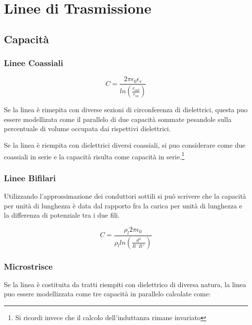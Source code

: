 \documentclass[10pt,a4paper]{report}
\begin{document}
\chapter{Linee di Trasmissione}

	\section{Capacità}

	
		\subsection{Linee Coassiali}
				\begin{equation}
				C=\frac{2\pi \epsilon_0 \epsilon_r} {ln (\frac { r_{out}} {r_{in} } )}
				\end{equation}

				Se la linea è rimepita con diverse sezioni di circonferenza di dielettrici, questa puo essere modellizata come il parallelo di due capacità sommate pesandole sulla percentuale di volume occupata dai rispettivi dielettrici.
			
				Se la linea è riempita con dielettrici diversi coassiali, si puo considerare come due coassiali in serie e la capacità risulta come capacità in serie.\footnote{Si ricordi invece che il calcolo dell'induttanza rimane invariato}


		\subsection{Linee Bifilari}

			Utilizzando l'approssimazione dei conduttori sottili si può scrivere che la capacità per unità di lunghezza è data dal rapporto fra la carica per unità di lunghezza e la 
			differenza di potenziale tra i due fili.
			

			\begin{equation}
			C=\frac{\rho_l 2 \pi \epsilon_0}{\rho_l ln(\frac{d^2}{R^-R^+})}
			\label{eq:capacitabifilare}
			\end{equation}



		\subsection{Microstrisce}

	

	 		Se la linea è costituita da tratti riempiti con dielettrico di diversa natura, la linea puo essere modellizzata come tre capacità in parallelo calcolate come:
\end{document}
